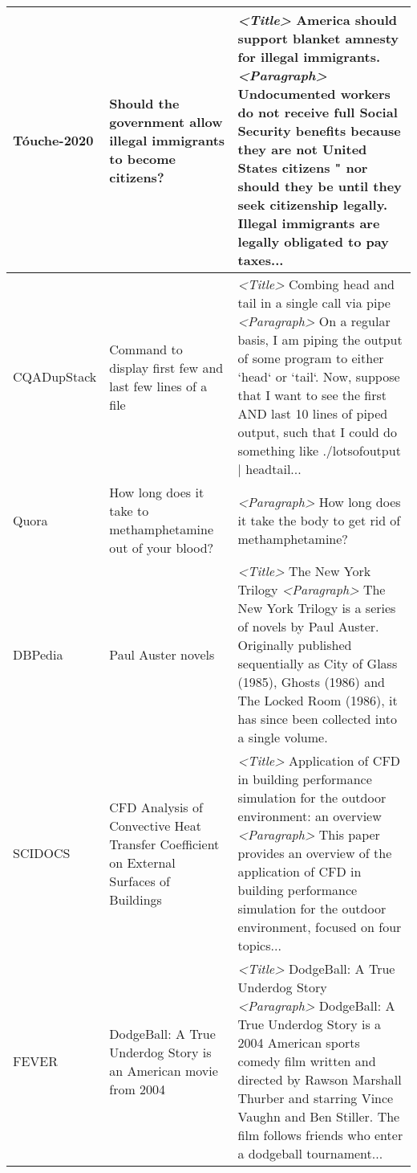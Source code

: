 \documentclass[11pt]{article}
\begin{document}
\begin{table*}[t!]
{\begin{tabular}{l | l | l }
   T\'ouche-2020 & \multicolumn{1}{p{6cm}|}{Should the government allow illegal immigrants to become citizens?} & \multicolumn{1}{p{13cm}}{\textit{<Title>} America should support blanket amnesty for illegal immigrants. \textit{<Paragraph>} Undocumented workers do not receive full Social Security benefits because they are not United States citizens " nor should they be until they seek citizenship legally. Illegal immigrants are legally obligated to pay taxes...} \\ \midrule 
   CQADupStack   & \multicolumn{1}{p{6cm}|}{Command to display first few and last few lines of a file} & \multicolumn{1}{p{13cm}}{\textit{<Title>} Combing head and tail in a single call via pipe \textit{<Paragraph>} On a regular basis, I am piping the output of some program to either `head` or `tail`. Now, suppose that I want to see the first AND last 10 lines of piped output, such that I could do something like ./lotsofoutput | headtail...} \\ \midrule
   Quora         & \multicolumn{1}{p{6cm}|}{How long does it take to methamphetamine out of your blood?} & \multicolumn{1}{p{13cm}}{\textit{<Paragraph>} How long does it take the body to get rid of methamphetamine?} \\ \midrule
   DBPedia       & \multicolumn{1}{p{6cm}|}{Paul Auster novels} & \multicolumn{1}{p{13cm}}{\textit{<Title>} The New York Trilogy \textit{<Paragraph>} The New York Trilogy is a series of novels by Paul Auster.  Originally published sequentially as City of Glass (1985), Ghosts (1986) and The Locked Room (1986), it has since been collected into a single volume.} \\ \midrule
   SCIDOCS       & \multicolumn{1}{p{6cm}|}{CFD Analysis of Convective Heat Transfer Coefficient on External Surfaces of Buildings} & \multicolumn{1}{p{13cm}}{ \textit{<Title>} Application of CFD in building performance simulation for the outdoor environment: an overview \textit{<Paragraph>} This paper provides an overview of the application of CFD in building performance simulation for the outdoor environment, focused on four topics...} \\ \midrule
   FEVER         & \multicolumn{1}{p{6cm}|}{DodgeBall: A True Underdog Story is an American movie from 2004} & \multicolumn{1}{p{13cm}}{\textit{<Title>} DodgeBall: A True Underdog Story \textit{<Paragraph>} DodgeBall: A True Underdog Story is a 2004 American sports comedy film written and directed by Rawson Marshall Thurber and starring Vince Vaughn and Ben Stiller. The film follows friends who enter a dodgeball tournament... } \\ \midrule

\end{tabular}}
\end{table*}
\end{document}
